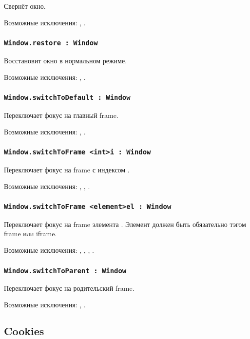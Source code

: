Свернёт окно.

Возможные исключения: , .

\subsubsection{\lstinline|Window.restore : Window|}

Восстановит окно в нормальном режиме.

Возможные исключения: , .

\subsubsection{\lstinline|Window.switchToDefault : Window|}

Переключает фокус на главный frame.

Возможные исключения: , .

\subsubsection{\lstinline|Window.switchToFrame <int>i : Window|}

Переключает фокус на frame с индексом .

Возможные исключения: , , .

\subsubsection{\lstinline|Window.switchToFrame <element>el : Window|}

Переключает фокус на frame элемента . Элемент должен быть обязательно тэгом frame или iframe.

Возможные исключения: , , , .

\subsubsection{\lstinline|Window.switchToParent : Window|}

Переключает фокус на родительский frame.

Возможные исключения: , .

\subsection{{\color{orange} Cookies}}

